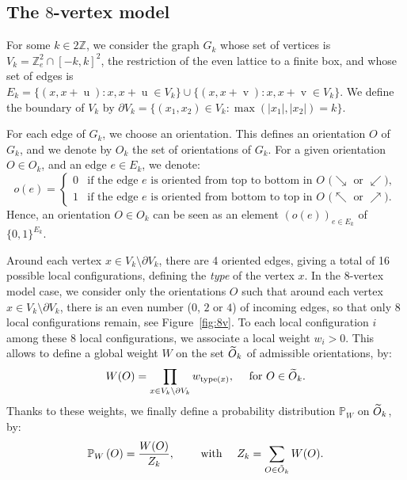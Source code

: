 \documentclass[AHL,Unicode,longabstracts]{cedram}
\let\oldtilde\tilde
\renewcommand*{\tilde}[1]{\mathchoice{\widetilde{#1}}{\widetilde{#1}}{\oldtilde{#1}}{\oldtilde{#1}}}
\newcounter{a}
\newcommand{\pw}[1]{\mathbb{P}_W\left(#1\right)}
\newcommand{\Z}{\mathbb{Z}}
\DeclareMathOperator{\vu}{u}
\DeclareMathOperator{\vv}{v}
\begin{document}
\subsection{The \texorpdfstring{$8$}{8}-vertex model} \label{sec:8V}

For some $k\in 2\Z$, we consider the graph $G_k$ whose set of vertices is $V_k=\Z_{e}^2 \cap [-k,k]^2$, the restriction of the even lattice to a finite box, and whose set of edges is $E_k=\{(x,x+\vu) : x,x+\vu\in V_k\}\cup\{(x,x+\vv) : x,x+\vv\in V_k\}$. We define the boundary of $V_k$ by $\partial V_k=\{(x_1,x_2)\in V_k : \max(|x_1|,|x_2|)=k\}$.

For each edge of $G_k$, we choose an orientation. This defines an orientation $O$ of $G_k$, and we denote by $O_k$ the set of orientations of $G_k$. For a given orientation $O\in O_k$, and an edge $e \in E_k$, we denote:
\[
o(e) =
\begin{cases}
0 & \text{if the edge $e$ is oriented from top to bottom in $O$ ($\searrow$ or $\swarrow$)},\\
1 & \text{if the edge $e$ is oriented from bottom to top in $O$ ($\nwarrow$ or $\nearrow$)}.
\end{cases}
\]
Hence, an orientation $O\in O_k$ can be seen as an element $(o(e))_{e \in E_k}$ of $\{0,1\}^{E_k}$.

Around each vertex $x\in V_k\setminus \partial V_k$, there are 4 oriented edges, giving a total of 16 possible local configurations, defining the \emph{type} of the vertex $x$. In the 8-vertex model case, we consider only the orientations $O$ such that around each vertex $x\in V_k\setminus \partial V_k$, there is an even number ($0$, $2$ or $4$) of incoming edges, so that only $8$ local configurations remain, see Figure~\ref{fig:8v}. To each local configuration $i$ among these 8 local configurations, we associate a local weight $w_i>0$. This allows to define a global weight $W$ on the set $\tilde O_k$ of admissible orientations, by:
\begin{equation*}
W(O) = \prod_{x\in V_k\setminus \partial V_k} w_{\text{type}(x)}, \quad \text{ for } O\in\tilde O_k.
\end{equation*}
Thanks to these weights, we finally define a probability distribution $\mathbb{P}_W$ on $\tilde O_k$, by:
\begin{equation*}
\pw{O} = \frac{W(O)}{Z_k}, \qquad \text{ with } \quad {Z_k=\sum_{O \in \tilde O_k} W(O)}.
\end{equation*}
\end{document}
